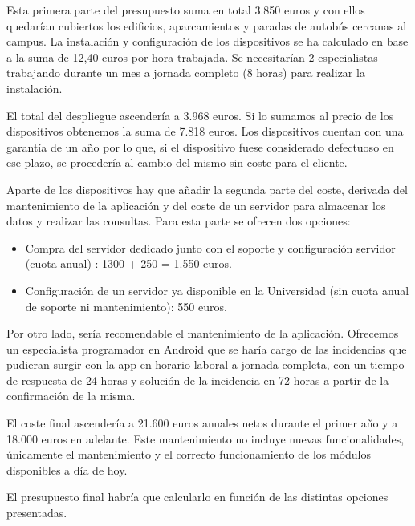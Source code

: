 Esta primera parte del presupuesto suma en total 3.850 euros y con ellos quedarían cubiertos los edificios, aparcamientos y paradas de autobús cercanas al campus. La instalación y configuración de los dispositivos se ha calculado en base a la suma de 12,40 euros por hora trabajada. Se necesitarían 2 especialistas trabajando durante un mes a jornada completo (8 horas) para realizar la instalación.

El total del despliegue ascendería a 3.968 euros. Si lo sumamos al precio de los dispositivos obtenemos la suma de 7.818 euros. Los dispositivos cuentan con una garantía de un año por lo que, si el dispositivo fuese considerado defectuoso en ese plazo, se procedería al cambio del mismo sin coste para el cliente.


Aparte de los dispositivos hay que añadir la segunda parte del coste, derivada del mantenimiento de la aplicación y  del coste de un servidor para almacenar los datos y realizar las consultas. Para esta parte se ofrecen dos opciones: 

\begin{itemize}
\item Compra del servidor dedicado junto con el soporte y configuración servidor (cuota anual) : 1300 + 250 = 1.550 euros.
\item Configuración de un servidor ya disponible en la Universidad (sin cuota anual de soporte ni mantenimiento): 550 euros. 
\end{itemize}


Por otro lado, sería recomendable el mantenimiento de la aplicación. Ofrecemos un especialista programador en Android que se haría cargo de las incidencias que pudieran surgir con la app en horario laboral a jornada completa, con un tiempo de respuesta de 24 horas y solución de la incidencia en 72 horas a partir de la confirmación de la misma.

El coste final ascendería a 21.600 euros anuales netos durante el primer año y a 18.000 euros en adelante. Este mantenimiento no incluye nuevas funcionalidades, únicamente el mantenimiento y el correcto funcionamiento de los módulos disponibles a día de hoy.

 
El presupuesto final habría que calcularlo en función de las distintas opciones presentadas.
